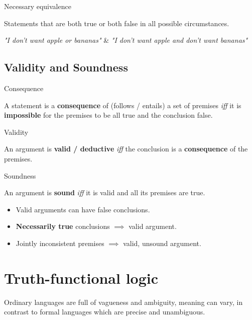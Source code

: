 \documentclass{article}
\begin{document}
\begin{definition}
    {Necessary equivalence}

    Statements that are both true or both false in all possible circumstances.

    \tcblower

    \textit{"I don't want apple or bananas"} \& \textit{"I don't want apple and don't want bananas"}
\end{definition}

\subsection{Validity and Soundness}

\begin{knBox}
    {Consequence}

    A statement is a \textbf{consequence} of (follows / entails) a set of premises \textit{iff} it is \textbf{impossible} for the premises to be all true and the conclusion false.
\end{knBox}

\begin{definition}
    {Validity}

    An argument is \textbf{valid / deductive} \textit{iff} the conclusion is a \textbf{consequence} of the premises.

\end{definition}

\begin{definition}
    {Soundness}

    An argument is \textbf{sound} \textit{iff} it is valid and all its premises are true.
\end{definition}

\begin{itemize}
    \item Valid arguments can have false conclusions.
    \item \textbf{Necessarily true} conclusions $\implies$ valid argument.
    \item Jointly inconsistent premises $\implies$ valid, unsound argument.
\end{itemize}

\section{Truth-functional logic}

Ordinary languages are full of vagueness and ambiguity, meaning can vary, in contrast to formal languages which are precise and unambiguous.
\end{document}
